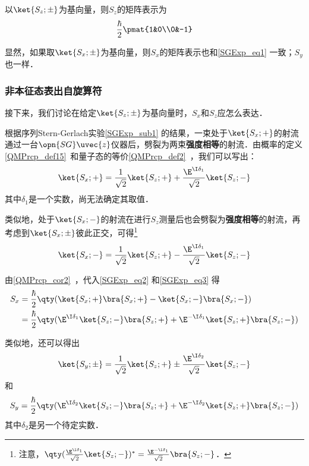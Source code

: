 以$\ket{S_z; \pm}$为基向量，则$S_z$的矩阵表示为
\begin{equation}\label{SGExp_eq1}
\frac{\hbar}{2}\pmat{1&0\\0&-1}
\end{equation}


显然，如果取$\ket{S_x; \pm}$为基向量，则$S_x$的矩阵表示也和\autoref{SGExp_eq1} 一致；$S_y$也一样．



\subsubsection{非本征态表出自旋算符}


接下来，我们讨论在给定$\ket{S_z; \pm}$为基向量时，$S_x$和$S_z$应怎么表达．

根据序列Stern-Gerlach实验\autoref{SGExp_sub1} 的结果，一束处于$\ket{S_x; +}$的射流通过一台$\opn{SG}\uvec{z}$仪器后，劈裂为两束\textbf{强度相等}的射流．由概率的定义\autoref{QMPrcp_def15}~和量子态的等价\autoref{QMPrcp_def2}~，我们可以写出：
\begin{equation}\label{SGExp_eq2}
\ket{S_x; +}=\frac{1}{\sqrt{2}}\ket{S_z; +}+\frac{\E^{\I \delta_1}}{\sqrt{2}}\ket{S_z; -}
\end{equation}
其中$\delta_1$是一个实数，尚无法确定其取值．

类似地，处于$\ket{S_x; -}$的射流在进行$S_z$测量后也会劈裂为\textbf{强度相等}的射流，再考虑到$\ket{S_x; \pm}$彼此正交，可得\footnote{注意，$\qty(\frac{\E^{\I \delta_1}}{\sqrt{2}}\ket{S_z; -})^*=\frac{\E^{-\I \delta_1}}{\sqrt{2}}\bra{S_z; -}$．}
\begin{equation}\label{SGExp_eq3}
\ket{S_x; -}=\frac{1}{\sqrt{2}}\ket{S_z; +}-\frac{\E^{\I \delta_1}}{\sqrt{2}}\ket{S_z; -}
\end{equation}


由\autoref{QMPrcp_cor2}~，代入\autoref{SGExp_eq2} 和\autoref{SGExp_eq3} 得
\begin{equation}\label{SGExp_eq4}
\begin{aligned}
S_x &= \frac{\hbar}{2}\qty(\ket{S_x; +}\bra{S_x; +}-\ket{S_x; -}\bra{S_x; -})\\
&=\frac{\hbar}{2}\qty(\E^{\I\delta_1}\ket{S_z; -}\bra{S_z; +} + \E^{-\I\delta_1}\ket{S_z; +}\bra{S_z; -})
\end{aligned}
\end{equation}

类似地，还可以得出
\begin{equation}\label{SGExp_eq7}
\ket{S_y; \pm} = \frac{1}{\sqrt{2}}\ket{S_z; +}\pm\frac{\E^{\I\delta_2}}{\sqrt{2}}\ket{S_z; -}
\end{equation}
和
\begin{equation}\label{SGExp_eq5}
S_y=\frac{\hbar}{2}\qty(\E^{\I\delta_2}\ket{S_z; -}\bra{S_z; +} + \E^{-\I\delta_2}\ket{S_z; +}\bra{S_z; -})
\end{equation}
其中$\delta_2$是另一个待定实数．

